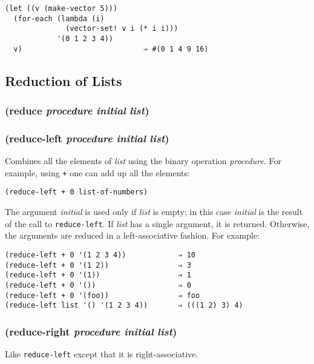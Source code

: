 \documentclass{article}
\begin{document}
\begin{verbatim}
(let ((v (make-vector 5)))
  (for-each (lambda (i)
              (vector-set! v i (* i i)))
            '(0 1 2 3 4))
  v)                            ⇒ #(0 1 4 9 16)
\end{verbatim}

\subsection{Reduction of Lists}\label{sec:reduction-of-lists}

\subsubsection{(reduce \emph{procedure} \emph{initial} \emph{list})}

\subsubsection{(reduce-left \emph{procedure} \emph{initial} \emph{list})}

Combines all the elements of \emph{list} using the binary operation \emph{procedure}. For
example, using \verb|+| one can add up all the elements:

\begin{verbatim}
(reduce-left + 0 list-of-numbers)
\end{verbatim}

The argument \emph{initial} is used only if \emph{list} is empty; in this case \emph{initial}
is the result of the call to \verb|reduce-left|. If \emph{list} has a single argument, it is
returned. Otherwise, the arguments are reduced in a left-associative fashion. For example:

\begin{verbatim}
(reduce-left + 0 '(1 2 3 4))            ⇒ 10
(reduce-left + 0 '(1 2))                ⇒ 3
(reduce-left + 0 '(1))                  ⇒ 1
(reduce-left + 0 '())                   ⇒ 0
(reduce-left + 0 '(foo))                ⇒ foo
(reduce-left list '() '(1 2 3 4))       ⇒ (((1 2) 3) 4)
\end{verbatim}

\subsubsection{(reduce-right \emph{procedure} \emph{initial} \emph{list})}

Like \verb|reduce-left| except that it is right-associative.
\end{document}
